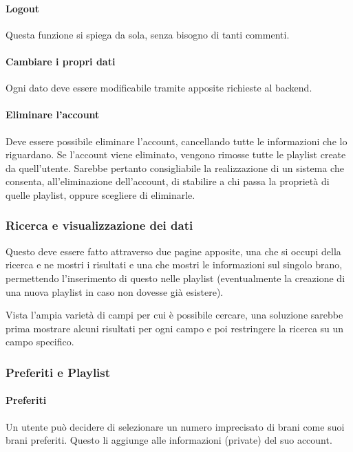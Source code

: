 \paragraph{Logout} Questa funzione si spiega da sola, senza bisogno di tanti commenti.
\paragraph{Cambiare i propri dati} Ogni dato deve essere modificabile tramite apposite richieste al backend.
\paragraph{Eliminare l'account} Deve essere possibile eliminare l'account, cancellando tutte le informazioni che lo riguardano. Se l'account viene eliminato, vengono rimosse tutte le playlist create da quell'utente. Sarebbe pertanto consigliabile la realizzazione di un sistema che consenta, all'eliminazione dell'account, di stabilire a chi passa la proprietà di quelle playlist, oppure scegliere di eliminarle.
\subsubsection{Ricerca e visualizzazione dei dati}
Questo deve essere fatto attraverso due pagine apposite, una che si occupi della ricerca e ne mostri i risultati e una che mostri le informazioni sul singolo brano, permettendo l'inserimento di questo nelle playlist (eventualmente la creazione di una nuova playlist in caso non dovesse già esistere).

Vista l'ampia varietà di campi per cui è possibile cercare, una soluzione sarebbe prima mostrare alcuni risultati per ogni campo e poi restringere la ricerca su un campo specifico.
\subsubsection{Preferiti e Playlist}
\paragraph{Preferiti} Un utente può decidere di selezionare un numero imprecisato di brani come suoi brani preferiti. Questo li aggiunge alle informazioni (private) del suo account.
